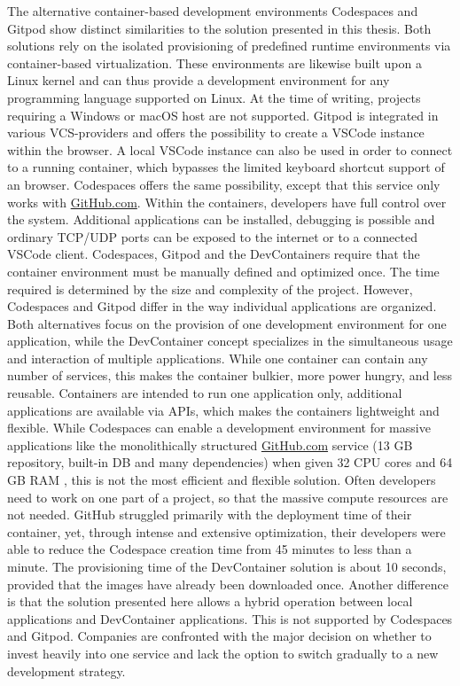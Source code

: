         The alternative container-based development environments Codespaces and Gitpod show distinct similarities to the solution presented in this thesis. Both solutions rely on the isolated provisioning of predefined runtime environments via container-based virtualization. These environments are likewise built upon a Linux kernel and can thus provide a development environment for any programming language supported on Linux. At the time of writing, projects requiring a Windows or macOS host are not supported.\newline
        Gitpod is integrated in various \ac{VCS}-providers and offers the possibility to create a \ac{VSCode} instance within the browser. A local \ac{VSCode} instance can also be used in order to connect to a running container, which bypasses the limited keyboard shortcut support of an browser. Codespaces offers the same possibility, except that this service only works with \href{https://www.GitHub.com}{GitHub.com}. Within the containers, developers have full control over the system. Additional applications can be installed, debugging is possible and ordinary TCP/UDP ports can be exposed to the internet or to a connected \ac{VSCode} client. Codespaces, Gitpod and the DevContainers require that the container environment must be manually defined and optimized once. The time required is determined by the size and complexity of the project.\newline
        However, Codespaces and Gitpod differ in the way individual applications are organized. Both alternatives focus on the provision of one development environment for one application, while the DevContainer concept specializes in the simultaneous usage and interaction of multiple applications. While one container can contain any number of services, this makes the container bulkier, more power hungry, and less reusable. Containers are intended to run one application only, additional applications are available via \ac{API}s, which makes the containers lightweight and flexible. While Codespaces can enable a development environment for massive applications like the monolithically structured \href{https://www.GitHub.com}{GitHub.com} service (13 GB repository, built-in \ac{DB} and many dependencies) when given 32 CPU cores and 64 GB RAM \cite{githubblogcodespace}, this is not the most efficient and flexible solution. Often developers need to work on one part of a project, so that the massive compute resources are not needed. GitHub struggled primarily with the deployment time of their container, yet, through intense and extensive optimization, their developers were able to reduce the Codespace creation time from 45 minutes to less than a minute. The provisioning time of the DevContainer solution is about 10 seconds, provided that the images have already been downloaded once. Another difference is that the solution presented here allows a hybrid operation between local applications and DevContainer applications. This is not supported by Codespaces and Gitpod. Companies are confronted with the major decision on whether to invest heavily into one service and lack the option to switch gradually to a new development strategy.\newline
